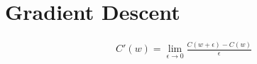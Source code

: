 \documentclass{article}
\begin{document}
\section{Gradient Descent}

\begin{align}
	C'(w) = \lim_{\epsilon \to 0}\frac{C(w + \epsilon) - C(w)}{\epsilon}
\end{align}
\end{document}
